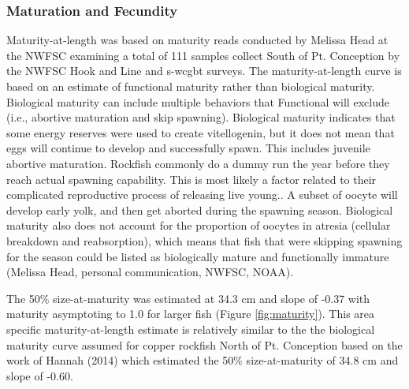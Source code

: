 \documentclass[11pt,
  english,
  a4paper,
]{article}
\begin{document}
\leavevmode\tagmcend\tagstructend\par


\hypertarget{maturation-and-fecundity}{%
\subsubsection{Maturation and Fecundity}\label{maturation-and-fecundity}}

\leavevmode\tagmcend\tagstructend


Maturity-at-length was based on maturity reads conducted by Melissa Head at the NWFSC examining a total of 111 samples collect South of Pt. Conception by the NWFSC Hook and Line and \Gls{s-wcgbt} surveys. The maturity-at-length curve is based on an estimate of functional maturity rather than biological maturity. Biological maturity can include multiple behaviors that Functional will exclude (i.e., abortive maturation and skip spawning). Biological maturity indicates that some energy reserves were used to create vitellogenin, but it does not mean that eggs will continue to develop and successfully spawn. This includes juvenile abortive maturation. Rockfish commonly do a dummy run the year before they reach actual spawning capability. This is most likely a factor related to their complicated reproductive process of releasing live young.. A subset of oocyte will develop early yolk, and then get aborted during the spawning season. Biological maturity also does not account for the proportion of oocytes in atresia (cellular breakdown and reabsorption), which means that fish that were skipping spawning for the season could be listed as biologically mature and functionally immature (Melissa Head, personal communication, NWFSC, NOAA).

\leavevmode\tagmcend\tagstructend\par


The 50\% size-at-maturity was estimated at 34.3 cm and slope of -0.37 with maturity asymptoting to 1.0 for larger fish (Figure \ref{fig:maturity}). This area specific maturity-at-length estimate is relatively similar to the the biological maturity curve assumed for copper rockfish North of Pt. Conception based on the work of Hannah {(2014)\leavevmode\tagmcend\tagstructend} which estimated the 50\% size-at-maturity of 34.8 cm and slope of -0.60.
\end{document}
